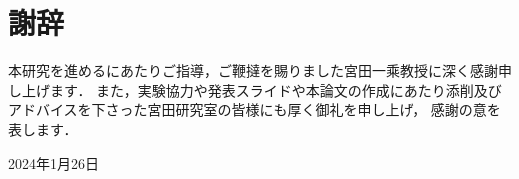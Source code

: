 \newpage

\chapter*{謝辞}


本研究を進めるにあたりご指導，ご鞭撻を賜りました宮田一乘教授に深く感謝申し上げます．
また，実験協力や発表スライドや本論文の作成にあたり添削及びアドバイスを下さった宮田研究室の皆様にも厚く御礼を申し上げ，
感謝の意を表します．
\begin{flushright}
	2024年1月26日
\end{flushright}

